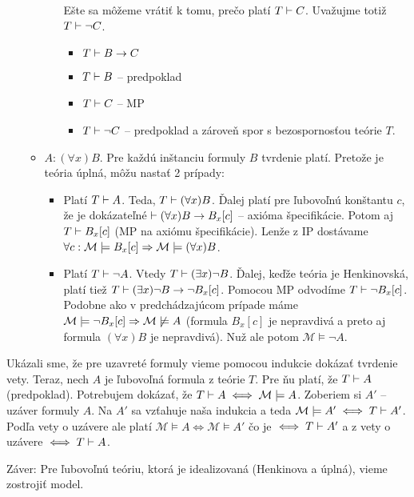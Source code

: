 \begin{dokaz}
\begin{itemize}
\begin{itemize}
\begin{itemize}
                Ešte sa môžeme vrátiť k tomu, prečo platí $T \vdash C$.
                Uvažujme totiž $T \vdash \neg C$.
                \begin{itemize}
                \item $T \vdash B \rightarrow C$
                \item $T \vdash B$ -- predpoklad
                \item $T \vdash C$ -- MP
                \item $T \vdash \neg C$ -- predpoklad a zároveň
                    spor s bezospornosťou teórie $T$.
                \end{itemize}
            \end{itemize}

        \item $A: (\forall x) B$. Pre každú
            inštanciu formuly $B$ tvrdenie platí.
            Pretože je teória úplná, môžu nastať 2 prípady:
            \begin{itemize}
            \item Platí $T\vdash A$.
                Teda, $T \vdash (\forall x) B$.
                Ďalej platí pre ľubovoľnú konštantu $c$,
                že je dokázateľné $\vdash (\forall x) B \rightarrow B_x[c]$
                -- axióma špecifikácie.
                Potom aj $T \vdash B_x[c]$ (MP na axiómu
                špecifikácie). Lenže z IP dostávame
                $\forall c: \mathcal{M} \models B_x[c] \Rightarrow 
                 \mathcal{M} \models (\forall x) B$.
            \smallskip
            \item Platí $T \vdash \neg A$. Vtedy
                $T \vdash (\exists x) \neg B$. Ďalej, keďže teória je
                Henkinovská, platí tiež 
                $T \vdash (\exists x) \neg B \rightarrow \neg B_x[c]$.
                Pomocou MP odvodíme
                $T \vdash \neg B_x[c]$. Podobne ako v
                predchádzajúcom prípade máme
                $\mathcal{M} \models \neg B_x[c] \Rightarrow
                 \mathcal{M} \not \models A$ (formula $B_x[c]$ je
                 nepravdivá a preto aj formula $(\forall x) B$ je
                 nepravdivá). Nuž ale potom
                 $\mathcal{M} \models \neg A$.
            \end{itemize}

        \end{itemize}
    \end{itemize}

    Ukázali sme, že pre uzavreté formuly vieme pomocou indukcie
    dokázať tvrdenie vety. Teraz, nech $A$ je ľubovoľná formula z teórie $T$.
    Pre ňu platí, že $T \vdash A$ (predpoklad).
    Potrebujem dokázať, že $T \vdash A \iff \mathcal{M} \models A$.
    Zoberiem si $A'$ -- uzáver formuly $A$.
    Na $A'$ sa vzťahuje naša indukcia a teda 
    $\mathcal{M} \models A' \iff T \vdash A'$.
    Podľa vety o uzávere ale platí
    $\mathcal{M} \models A \iff  \mathcal{M} \models A'$ čo je 
    $\iff T \vdash A'$ a z vety o uzávere $\iff T \vdash A$.
    \\
\end{dokaz}

\noindent
Záver: Pre ľubovoľnú teóriu, ktorá je idealizovaná (Henkinova a
úplná), vieme zostrojiť model.

